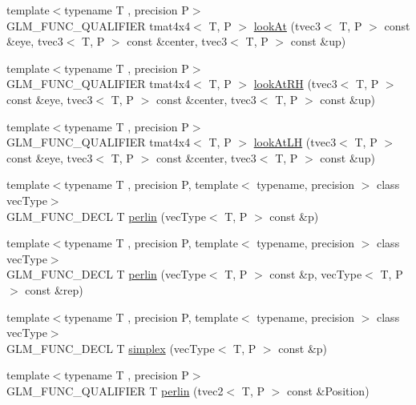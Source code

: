 \begin{DoxyCompactItemize}
\item 
{\footnotesize template$<$typename T , precision P$>$ }\\G\+L\+M\+\_\+\+F\+U\+N\+C\+\_\+\+Q\+U\+A\+L\+I\+F\+I\+E\+R tmat4x4$<$ T, P $>$ \hyperlink{group__gtc__matrix__transform_gaf8eef81da1ad09f6a8920101c01eaae4}{look\+At} (tvec3$<$ T, P $>$ const \&eye, tvec3$<$ T, P $>$ const \&center, tvec3$<$ T, P $>$ const \&up)
\item 
{\footnotesize template$<$typename T , precision P$>$ }\\G\+L\+M\+\_\+\+F\+U\+N\+C\+\_\+\+Q\+U\+A\+L\+I\+F\+I\+E\+R tmat4x4$<$ T, P $>$ \hyperlink{group__gtc__matrix__transform_ga2876d9313334980b94292d2ec169088e}{look\+At\+R\+H} (tvec3$<$ T, P $>$ const \&eye, tvec3$<$ T, P $>$ const \&center, tvec3$<$ T, P $>$ const \&up)
\item 
{\footnotesize template$<$typename T , precision P$>$ }\\G\+L\+M\+\_\+\+F\+U\+N\+C\+\_\+\+Q\+U\+A\+L\+I\+F\+I\+E\+R tmat4x4$<$ T, P $>$ \hyperlink{group__gtc__matrix__transform_gacd0c077ec7b58a575855e29cb5fb586d}{look\+At\+L\+H} (tvec3$<$ T, P $>$ const \&eye, tvec3$<$ T, P $>$ const \&center, tvec3$<$ T, P $>$ const \&up)
\item 
{\footnotesize template$<$typename T , precision P, template$<$ typename, precision $>$ class vec\+Type$>$ }\\G\+L\+M\+\_\+\+F\+U\+N\+C\+\_\+\+D\+E\+C\+L T \hyperlink{group__gtc__noise_ga14e5975486b2b36e747861d3c65b16c1}{perlin} (vec\+Type$<$ T, P $>$ const \&p)
\item 
{\footnotesize template$<$typename T , precision P, template$<$ typename, precision $>$ class vec\+Type$>$ }\\G\+L\+M\+\_\+\+F\+U\+N\+C\+\_\+\+D\+E\+C\+L T \hyperlink{group__gtc__noise_ga7e103ffffacb322fe2d4863c372ae2fd}{perlin} (vec\+Type$<$ T, P $>$ const \&p, vec\+Type$<$ T, P $>$ const \&rep)
\item 
{\footnotesize template$<$typename T , precision P, template$<$ typename, precision $>$ class vec\+Type$>$ }\\G\+L\+M\+\_\+\+F\+U\+N\+C\+\_\+\+D\+E\+C\+L T \hyperlink{group__gtc__noise_ga05f5ab240c9a3fdeee353636e464c285}{simplex} (vec\+Type$<$ T, P $>$ const \&p)
\item 
{\footnotesize template$<$typename T , precision P$>$ }\\G\+L\+M\+\_\+\+F\+U\+N\+C\+\_\+\+Q\+U\+A\+L\+I\+F\+I\+E\+R T \hyperlink{namespaceglm_a911cdd6eb03df468ebd2b6f17ea43a3f}{perlin} (tvec2$<$ T, P $>$ const \&Position)

\end{DoxyCompactItemize}

